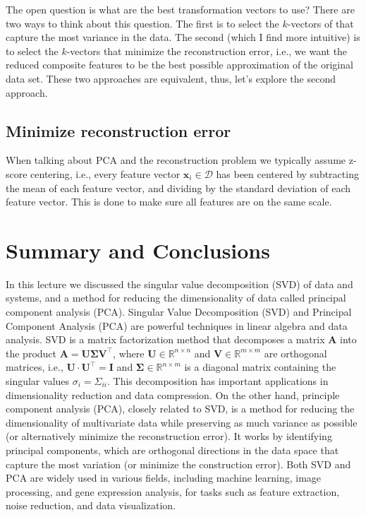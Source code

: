 \documentclass{article}[11pt]
\def\D{\mathcal{D}}
\begin{document}
The open question is what are the best transformation vectors to use? 
There are two ways to think about this question. The first is to select the $k$-vectors of that capture the most variance in the data. 
The second (which I find more intuitive) is to select the $k$-vectors that minimize the reconstruction error, 
i.e., we want the reduced composite features to be the best possible approximation of the original data set.
These two approaches are equivalent, thus, let's explore the second approach.

\subsection*{Minimize reconstruction error}
When talking about PCA and the reconstruction problem we typically assume z-score centering, i.e., every feature vector $\mathbf{x}_{i}\in\D$ has been centered by subtracting the mean of each feature vector, 
and dividing by the standard deviation of each feature vector. This is done to make sure all features are on the same scale.

\section{Summary and Conclusions}
In this lecture we discussed the singular value decomposition (SVD) of data and systems, and a method for reducing the dimensionality of data called principal component analysis (PCA).
Singular Value Decomposition (SVD) and Principal Component Analysis (PCA) are powerful techniques in linear algebra and data analysis. 
SVD is a matrix factorization method that decomposes a matrix $\mathbf{A}$ into the product $\mathbf{A} = \mathbf{U}\mathbf{\Sigma}\mathbf{V}^{\top}$, where
$\mathbf{U}\in\mathbb{R}^{n\times{n}}$ and $\mathbf{V}\in\mathbb{R}^{m\times{m}}$ are orthogonal matrices, i.e., $\mathbf{U}\cdot\mathbf{U}^{\top} = \mathbf{I}$ and $\mathbf{\Sigma}\in\mathbb{R}^{n\times{m}}$ 
is a diagonal matrix containing the singular values $\sigma_{i}=\Sigma_{ii}$.
This decomposition has important applications in dimensionality reduction and data compression. 
On the other hand, principle component analysis (PCA), closely related to SVD, 
is a method for reducing the dimensionality of multivariate data while preserving as much variance as possible (or alternatively minimize the reconstruction error). 
It works by identifying principal components, which are orthogonal directions in the data space that capture the most variation (or minimize the construction error). 
Both SVD and PCA are widely used in various fields, including machine learning, image processing, and gene expression analysis, 
for tasks such as feature extraction, noise reduction, and data visualization.


\end{document}
